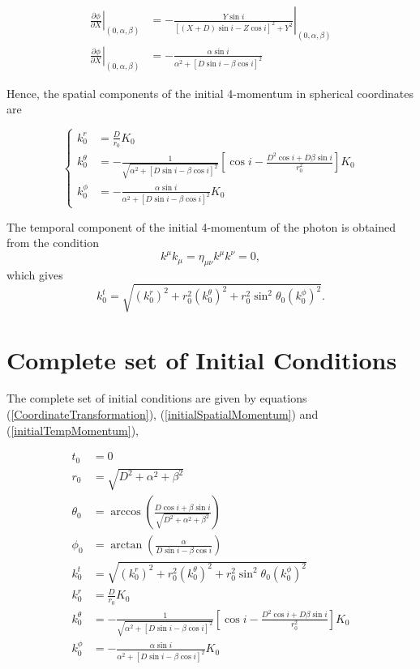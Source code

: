 \begin{align}
\left. \frac{\partial \phi}{\partial X} \right|_{(0,\alpha,\beta)} &= \left.-\frac{Y \sin i}{[(X+D)\sin i - Z \cos i ]^2 + Y^2 } \right|_{(0,\alpha,\beta)} \nonumber \\
\left. \frac{\partial \phi}{\partial X} \right|_{(0,\alpha,\beta)} &= -\frac{\alpha \sin i}{\alpha^2 +[D \sin i - \beta \cos i]^2 }  
\end{align}

Hence, the spatial components of the initial 4-momentum in spherical coordinates are

\begin{equation}
\begin{cases}
k^r_0 &= \frac{D}{r_0} K_0\\
k^\theta _0 &= -\frac{1}{\sqrt{\alpha^2 +[D\sin i - \beta \cos i]^2}}  \left[ \cos i - \frac{D^2 \cos i + D\beta \sin i}{r^2_0}\right] K_0 \\
k^\phi _0 &= -\frac{\alpha \sin i}{\alpha^2 +[D \sin i - \beta \cos i]^2 } K_0
\end{cases} \label{initialSpatialMomentum}
\end{equation}

The temporal component of the initial 4-momentum of the photon is obtained from the condition 
\begin{equation}
k^\mu k_\mu =  \eta_{\mu \nu} k^\mu k^\nu = 0,
\end{equation}
which gives
\begin{equation}
k^t_0 = \sqrt{(k^r_0)^2 + r_0^2 (k^\theta _0)^2 + r_0^2 \sin^2 \theta_0 (k^\phi _0)^2}. \label{initialTempMomentum}
\end{equation}

\section{Complete set of Initial Conditions}

The complete set of initial conditions are given by equations (\ref{CoordinateTransformation}), (\ref{initialSpatialMomentum}) and (\ref{initialTempMomentum}),

\begin{align}
t_0 &= 0\\
r_0 &= \sqrt{D^2 + \alpha^2 + \beta^2} \\
\theta_0 &= \arccos \left( \frac{D \cos i + \beta \sin i}{\sqrt{D^2 + \alpha^2 + \beta^2}}\right)\\
\phi_0 &= \arctan \left( \frac{\alpha}{D\sin i - \beta \cos i} \right) \\
k^t_0 &= \sqrt{(k^r_0)^2 + r_0^2 (k^\theta _0)^2 + r_0^2 \sin^2 \theta_0 (k^\phi _0)^2}\\
k^r_0 &= \frac{D}{r_0} K_0\\
k^\theta _0 &= -\frac{1}{\sqrt{\alpha^2 +[D\sin i - \beta \cos i]^2}}  \left[ \cos i - \frac{D^2 \cos i + D\beta \sin i}{r^2_0}\right] K_0 \\
k^\phi _0 &= -\frac{\alpha \sin i}{\alpha^2 +[D \sin i - \beta \cos i]^2 } K_0
\end{align}


